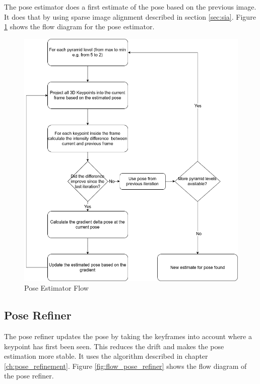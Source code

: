 \documentclass[11pt,a4paper,titlepage,oneside]{report}
\begin{document}
The pose estimator does a first estimate of the pose based on the previous image. It does that by using sparse image alignment described in section \ref{sec:sia}. Figure \ref{fig:flow_pose_estimator} shows the flow diagram for the pose estimator.

\begin{figure}[H]
  \centering
  \includegraphics[scale=0.3]{img/flow_pose_estimator.png}
  \caption{Pose Estimator Flow}\label{fig:flow_pose_estimator}
\end{figure}

\subsection{Pose Refiner}

The pose refiner updates the pose by taking the keyframes into account where a keypoint has first been seen. This reduces the drift and makes the pose estimation more stable. It uses the algorithm described in chapter \ref{ch:pose_refinement}. Figure \ref{fig:flow_pose_refiner} shows the flow diagram of the pose refiner.
\end{document}
